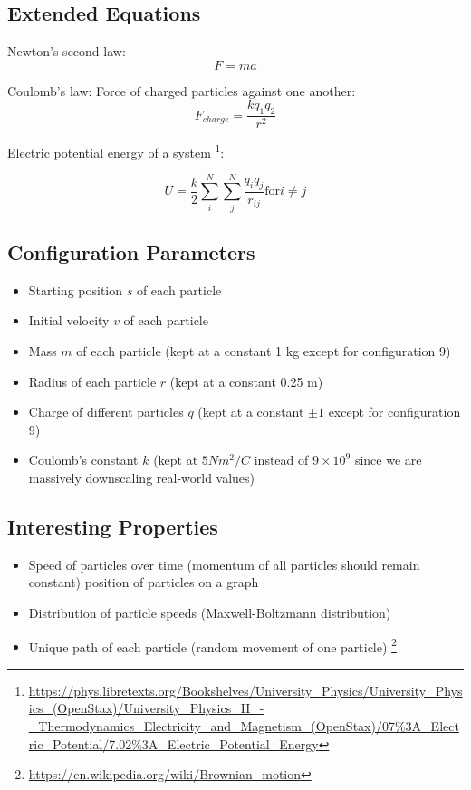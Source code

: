 \documentclass{article}
\begin{document}
\subsection{Extended Equations}

Newton's second law:
\begin{equation}
F = ma
\end{equation}

Coulomb's law: Force of charged particles against one another:
\begin{equation}
    F_{charge} = \frac{kq_1q_2}{r^2}
\end{equation}

Electric potential energy of a system
\footnote{\url{https://phys.libretexts.org/Bookshelves/University_Physics/University_Physics_(OpenStax)/University_Physics_II_-_Thermodynamics_Electricity_and_Magnetism_(OpenStax)/07\%3A_Electric_Potential/7.02\%3A_Electric_Potential_Energy}}:

\begin{equation}
    U = \frac{k}{2} \sum_i^N \sum_j^N \frac{q_iq_j}{r_{ij}} \text{for} i \neq j
\end{equation}

\subsection{Configuration Parameters}
\begin{itemize}
    \item Starting position $s$ of each particle
    \item Initial velocity $v$ of each particle
    \item Mass $m$ of each particle (kept at a constant 1 kg except for configuration 9)
    \item Radius of each particle $r$ (kept at a constant 0.25 m)
    \item Charge of different particles $q$ (kept at a constant $\pm 1$ except for configuration 9)
    \item Coulomb's constant $k$ (kept at $5 Nm^2/C$ instead of $9\times 10^9$ since we are massively downscaling real-world values)
\end{itemize}

\subsection{Interesting Properties}
\begin{itemize}
    \item Speed of particles over time (momentum of all particles should remain constant) position of particles on a graph
    \item Distribution of particle speeds (Maxwell-Boltzmann distribution)
    \item Unique path of each particle (random movement of one particle) \footnote{\url{https://en.wikipedia.org/wiki/Brownian_motion}}
\end{itemize}
\end{document}
